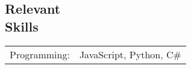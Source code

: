 \documentclass[margin,line,pifont,palatino,courier]{res}
\begin{document}
\begin{resume}


\section{\sc Relevant \\ Skills}

\begin{tabular}{@{}p{0.8in}p{6in}}

Programming:& JavaScript, Python, C\# \\

\end{tabular}




\end{resume}
\end{document}
